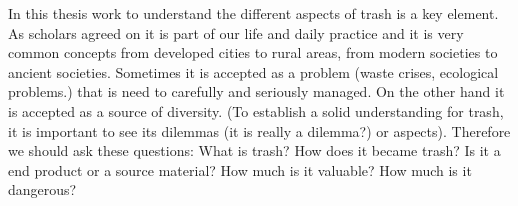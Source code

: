 In this thesis work to understand the different aspects of trash is a key element.  As scholars agreed on  it is part of our life and daily practice and it is very common concepts from developed cities to rural areas, from modern societies to ancient societies. Sometimes it is accepted as a problem (waste crises, ecological problems.) that is need to carefully and seriously managed. On the other hand it is accepted as a source of diversity. (To establish a solid understanding for trash, it is important to see its dilemmas (it is really a dilemma?) or aspects). Therefore we should ask these questions: What is trash? How does it became trash? Is it a end product or a source material? How much is it valuable? How much is it dangerous?



